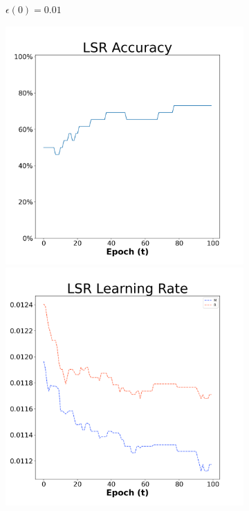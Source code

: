 \begin{figure}[H]
\begin{subfigure}{0.3\textwidth}
  \caption{$\epsilon(0)=0.01$}
\end{subfigure}\hfil %
\begin{subfigure}{0.3\textwidth}
  \includegraphics[width=\linewidth]{images/exper1/Sonar/LSR_0.03_acc.png}
  \includegraphics[width=\linewidth]{images/exper1/Sonar/LSR_0.03_lr.png}

\end{subfigure}
\end{figure}
